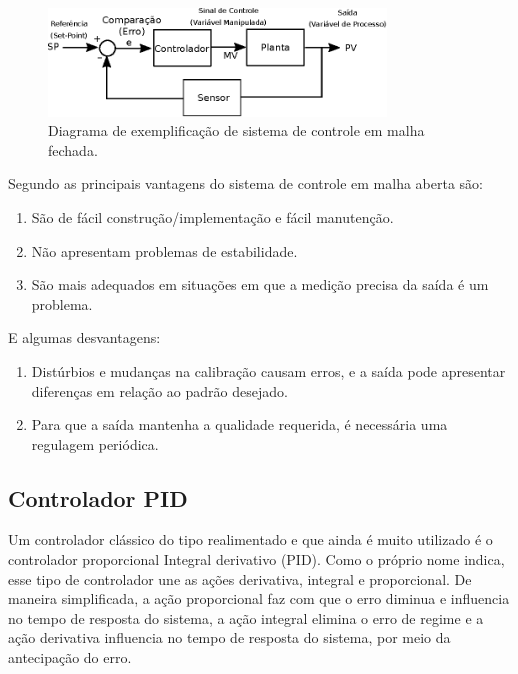 \begin{figure}[H]
    \centering
    \includegraphics[width=0.8\textwidth]{figuras/ilustracoes/diagrama_sistema_malha_fechada.eps}
    \caption{Diagrama de exemplificação de sistema de controle em malha fechada.}
    \label{fig:ilustracao_sistema_malha_fechada}
\end{figure}


Segundo \cite{ogata2011engenharia} as principais vantagens do sistema de controle em malha aberta são:
\begin{enumerate}
    \item São de fácil construção/implementação e fácil manutenção.
    \item Não apresentam problemas de estabilidade.
    \item São mais adequados em situações em que a medição precisa da saída é um problema.
\end{enumerate}

E algumas desvantagens:

\begin{enumerate}
    \item Distúrbios e mudanças na calibração causam erros, e a saída pode apresentar diferenças
    em relação ao padrão desejado.
    \item Para que a saída mantenha a qualidade requerida, é necessária uma regulagem periódica.
\end{enumerate}


\subsection{Controlador PID}
Um controlador clássico do tipo realimentado e que ainda é muito utilizado é o controlador proporcional Integral derivativo (PID). Como o próprio nome indica, esse tipo de controlador une as ações derivativa, integral e proporcional. De maneira simplificada, a ação proporcional faz com que o erro diminua e influencia no tempo de resposta do sistema, a ação integral elimina o erro de regime e a ação derivativa influencia no tempo de resposta do sistema, por meio da antecipação do erro.

